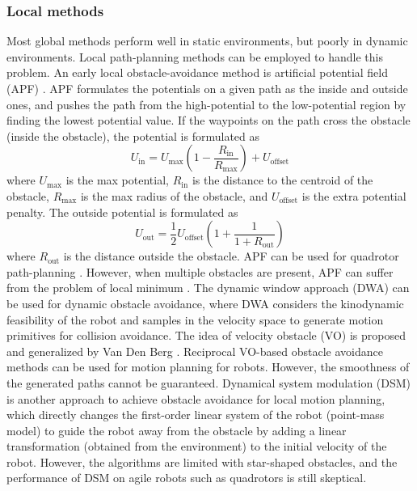 \documentclass[letterpaper,journal,twoside]{IEEEtran}
\begin{document}
\subsubsection{Local methods}
Most global methods perform well in static environments, 
but poorly in dynamic environments. 
Local path-planning methods can be employed to handle 
this problem. 
An early local obstacle-avoidance method is artificial 
potential field (APF) \cite{warren1989global}.
APF formulates the potentials on a given path as the 
inside and outside ones, and pushes the path from the
high-potential to the low-potential region by finding the 
lowest potential value. 
If the waypoints on the path cross the 
obstacle (inside the obstacle), the potential is formulated as 
\[
U_{\text{in}} = 
U_{\text{max}}\left(1 - \frac{R_{\text{in}}}{R_{\text{max}}}\right) + 
U_{\text{offset}}
\]
where $U_{\text{max}}$ is the max potential, 
$R_{\text{in}}$ is the distance to the centroid of the 
obstacle, $R_{\text{max}}$ is the max radius of the 
obstacle, and $U_{\text{offset}}$ is the extra 
potential penalty.
The outside potential is formulated as 
\[
U_{\text{out}} = 
\frac{1}{2}U_{\text{offset}}\left(1+ \frac{1}{1+R_\text{out}}\right)
\]
where $R_{\text{out}}$ is the distance outside the obstacle.
APF can be used for quadrotor path-planning \cite{chen2016uav}.
However, when multiple obstacles are present, APF can suffer 
from the problem of local minimum \cite{koren1991potential}.
The dynamic window approach (DWA) \cite{seder2007dynamic} can 
be used for dynamic obstacle avoidance, where DWA considers
the kinodynamic feasibility of the robot and samples in the 
velocity space to generate motion primitives for collision 
avoidance. 
The idea of velocity obstacle (VO) is proposed and generalized
by Van Den Berg \cite{van2011reciprocal,van2011reciprocal2,bareiss2013reciprocal}.
Reciprocal VO-based obstacle avoidance methods can be used
for motion planning for robots.  
However, the smoothness of the generated paths cannot be 
guaranteed. 
Dynamical system modulation (DSM)
\cite{khansari2012dynamical,huber2022fast,huber2023avoidance}
is another approach to achieve obstacle avoidance for local
motion planning, which directly changes the first-order 
linear system of the robot (point-mass model) to guide the 
robot away from the obstacle by adding a linear transformation
(obtained from the environment) to the initial velocity of 
the robot.
However, the algorithms are limited with star-shaped obstacles, 
and the performance of DSM on agile robots such as quadrotors
is still skeptical.
\end{document}
